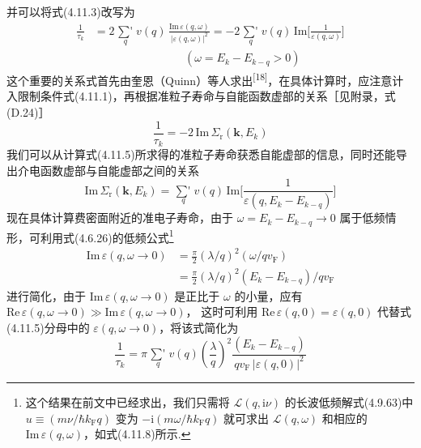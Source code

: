 并可以将式(4.11.3)改写为
\begin{equation}
\begin{aligned}
  \frac{1}{\tau_{k}}&=2\mathop{{\sum}'}\limits_{q}v(q)\,
  \frac{\mathrm{Im}\,\varepsilon(q,\omega)}{|\varepsilon(q,\omega)|^{2}}
  =-2\mathop{{\sum}'}\limits_{q}v(q)\,
  \mathrm{Im}\bigg[\frac{1}{\varepsilon(q,\omega)}\bigg]\\
  &\qquad\qquad\qquad\qquad\left(\omega=E_{k}-E_{k-q}>0\right)
\end{aligned}
\end{equation}
这个重要的关系式首先由奎恩（Quinn）等人求出\textsuperscript{[18]}，在具体计算时，应注意计入限制条件式(4.11.1)，再根据准粒子寿命与自能函数虚部的关系［见附录，式(D.24)］
\begin{equation}
  \frac{1}{\tau_{k}}=-2\,\mathrm{Im}\,\varSigma_{\mathrm{r}}(\boldsymbol{k},E_{k})
\end{equation}
我们可以从计算式(4.11.5)所求得的准粒子寿命获悉自能虚部的信息，同时还能导出介电函数虚部与自能虚部之间的关系
\begin{equation}
  \mathrm{Im}\,\varSigma_{\mathrm{r}}(\boldsymbol{k},E_{k})
  =\mathop{{\sum}'}\limits_{q}v(q)\,
  \mathrm{Im}\bigg[\frac{1}{\varepsilon\left(q,E_{k}-E_{k-q}\right)}\bigg]
\end{equation}
现在具体计算费密面附近的准电子寿命，由于 $\omega=E_{k}-E_{k-q}\to 0$ 属于低频情形，可利用式(4.6.26)的低频公式\footnote{这个结果在前文中已经求出，我们只需将 $\mathcal{L}(q,\mathrm{i}\nu)$ 的长波低频解式(4.9.63)中 $u\equiv\left(m\nu/\hbar k_{\mathrm{F}}q\right)$ 变为 $-\mathrm{i}\left(m\omega/\hbar k_{\mathrm{F}}q\right)$ 就可求出 $\mathcal{L}(q,\omega)$ 和相应的 $\mathrm{Im}\,\varepsilon(q,\omega)$，如式(4.11.8)所示.}
\begin{equation}
\begin{aligned}
  \mathrm{Im}\,\varepsilon(q,\omega\to 0)
  &=\frac{\pi}{2}\left(\lambda/q\right)^{2}\left(\omega/qv_{\mathrm{F}}\right)\\
  &=\frac{\pi}{2}\left(\lambda/q\right)^{2}
  \left(E_{k}-E_{k-q}\right)/qv_{\mathrm{F}}
\end{aligned}
\end{equation}
进行简化，由于 $\mathrm{Im}\,\varepsilon(q,\omega\to 0)$ 是正比于 $\omega$ 的小量，应有
$\mathrm{Re}\,\varepsilon(q,\omega\to 0)\gg\mathrm{Im}\,\varepsilon(q,\omega\to 0)$，
这时可利用 $\mathrm{Re}\,\varepsilon(q,0)=\varepsilon(q,0)$ 代替式(4.11.5)分母中的 $\varepsilon(q,\omega\to 0)$，将该式简化为
\begin{equation}
  \frac{1}{\tau_{k}}=\pi\mathop{{\sum}'}\limits_{q}v(q)
  \left(\frac{\lambda}{q}\right)^{2}
  \frac{\left(E_{k}-E_{k-q}\right)}
  {qv_{\mathrm{F}}\,|\varepsilon(q,0)|^{2}}
\end{equation}
